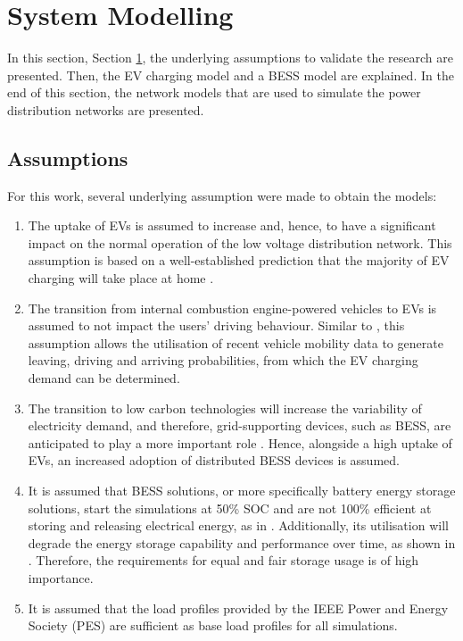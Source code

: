 \section{System Modelling}
\label{ch4:sec:system-modelling}

In this section, Section \ref{ch4:sec:system-modelling}, the underlying assumptions to validate the research are presented.
Then, the EV charging model and a BESS model are explained.
In the end of this section, the network models that are used to simulate the power distribution networks are presented.

\subsection{Assumptions}
\label{ch4:subsec:assumptions}

For this work, several underlying assumption were made to obtain the models:

\begin{enumerate}
\item
The uptake of EVs is assumed to increase and, hence, to have a significant impact on the normal operation of the low voltage distribution network.
This assumption is based on a well-established prediction that the majority of EV charging will take place at home \cite{Munkhammar2015a}.
\item
The transition from internal combustion engine-powered vehicles to EVs is assumed to not impact the users' driving behaviour.
Similar to \cite{Dallinger2012}, this assumption allows the utilisation of recent vehicle mobility data \cite{MiD2008} to generate leaving, driving and arriving probabilities, from which the EV charging demand can be determined.
\item
The transition to low carbon technologies will increase the variability of electricity demand, and therefore, grid-supporting devices, such as BESS, are anticipated to play a more important role \cite{FES2015}.
Hence, alongside a high uptake of EVs, an increased adoption of distributed BESS devices is assumed.
\item
It is assumed that BESS solutions, or more specifically battery energy storage solutions, start the simulations at 50\% SOC and are not 100\% efficient at storing and releasing electrical energy, as in \cite{Rowe2014a}.
Additionally, its utilisation will degrade the energy storage capability and performance over time, as shown in \cite{Laresgoiti2015}.
Therefore, the requirements for equal and fair storage usage is of high importance.
\item
It is assumed that the load profiles provided by the IEEE Power and Energy Society (PES) are sufficient as base load profiles for all simulations.
\end{enumerate}

